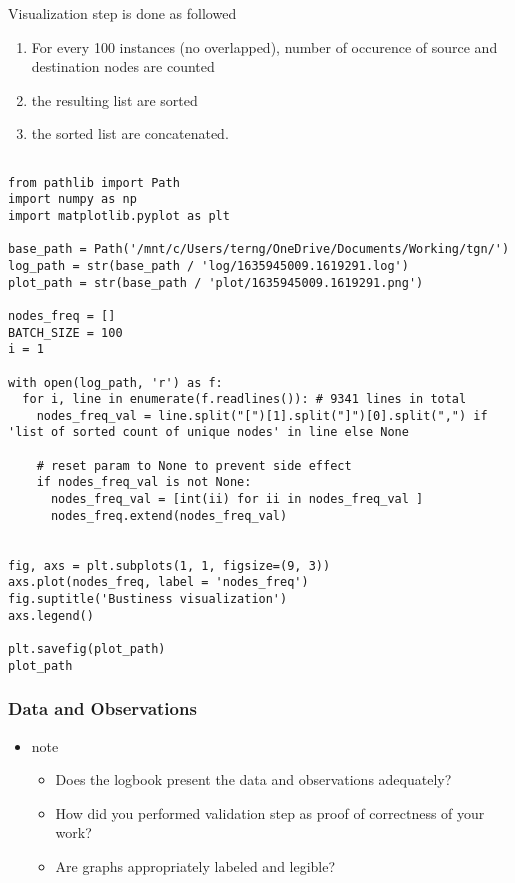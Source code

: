 \documentclass[11pt]{article}
\begin{document}
Visualization step is done as followed
\begin{enumerate}
\item For every 100 instances (no overlapped), number of occurence of source and destination nodes are counted
\item the resulting list are sorted
\item the sorted list are concatenated.
\end{enumerate}
\begin{verbatim}

from pathlib import Path
import numpy as np
import matplotlib.pyplot as plt

base_path = Path('/mnt/c/Users/terng/OneDrive/Documents/Working/tgn/')
log_path = str(base_path / 'log/1635945009.1619291.log')
plot_path = str(base_path / 'plot/1635945009.1619291.png')

nodes_freq = []
BATCH_SIZE = 100
i = 1

with open(log_path, 'r') as f:
  for i, line in enumerate(f.readlines()): # 9341 lines in total
    nodes_freq_val = line.split("[")[1].split("]")[0].split(",") if 'list of sorted count of unique nodes' in line else None

    # reset param to None to prevent side effect
    if nodes_freq_val is not None:
      nodes_freq_val = [int(ii) for ii in nodes_freq_val ]
      nodes_freq.extend(nodes_freq_val)


fig, axs = plt.subplots(1, 1, figsize=(9, 3))
axs.plot(nodes_freq, label = 'nodes_freq')
fig.suptitle('Bustiness visualization')
axs.legend()

plt.savefig(plot_path)
plot_path

\end{verbatim}

\subsubsection{Data and Observations}
\label{sec:org7f5ae60}
\begin{itemize}
\item note
\begin{itemize}
\item Does the logbook present the data and observations adequately?
\item How did you performed validation step as proof of correctness of your work?
\item Are graphs appropriately labeled and legible?
\end{itemize}
\end{itemize}
\end{document}
